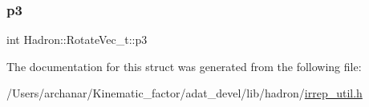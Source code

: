 \subsubsection{\texorpdfstring{p3}{p3}}
{\footnotesize\ttfamily int Hadron\+::\+Rotate\+Vec\+\_\+t\+::p3}



The documentation for this struct was generated from the following file\+:\begin{DoxyCompactItemize}
\item 
/\+Users/archanar/\+Kinematic\+\_\+factor/adat\+\_\+devel/lib/hadron/\mbox{\hyperlink{lib_2hadron_2irrep__util_8h}{irrep\+\_\+util.\+h}}\end{DoxyCompactItemize}
